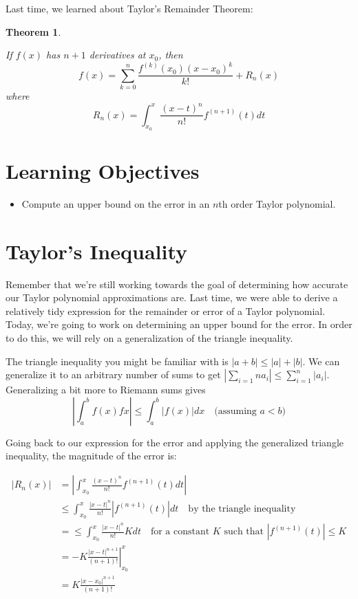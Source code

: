 \documentclass[
]{book}
\providecommand{\tightlist}{%
  \setlength{\itemsep}{0pt}\setlength{\parskip}{0pt}}
\newtheorem{theorem}{Theorem}[chapter]
\theoremstyle{definition}
\theoremstyle{definition}
\theoremstyle{definition}
\theoremstyle{definition}
\theoremstyle{remark}
\begin{document}
Last time, we learned about Taylor's Remainder Theorem:

\begin{theorem}
\protect\hypertarget{thm:unlabeled-div-162}{}\label{thm:unlabeled-div-162}

If \(f(x)\) has \(n+1\) derivatives at \(x_0\), then \[f(x)=\sum_{k=0}^n \frac{f^{(k)}(x_0)(x-x_0)^k}{k!}+R_n(x)\] where \[R_n(x)=\int_{x_0}^x\frac{(x-t)^n}{n!}f^{(n+1)}(t)dt\]

\end{theorem}

\hypertarget{learning-objectives-22}{%
\section{Learning Objectives}\label{learning-objectives-22}}

\begin{itemize}
\tightlist
\item
  Compute an upper bound on the error in an \(n\)th order Taylor polynomial.
\end{itemize}

\hypertarget{taylors-inequality}{%
\section{Taylor's Inequality}\label{taylors-inequality}}

Remember that we're still working towards the goal of determining how accurate our Taylor polynomial approximations are. Last time, we were able to derive a relatively tidy expression for the remainder or error of a Taylor polynomial. Today, we're going to work on determining an upper bound for the error. In order to do this, we will rely on a generalization of the triangle inequality.

The triangle inequality you might be familiar with is \(|a+b|\leq |a|+|b|\). We can generalize it to an arbitrary number of sums to get \(\displaystyle \left | \sum_{i=1}n a_i \right | \leq \sum_{i=1}^n |a_i|\). Generalizing a bit more to Riemann sums gives \[\left |\int_a^b f(x)fx \right |\leq \int_a^b |f(x)|dx \quad \mbox{(assuming $a<b$)}\]

Going back to our expression for the error and applying the generalized triangle inequality, the magnitude of the error is:

\begin{align*}
|R_n(x)|&= \left | \int_{x_0}^x\frac{(x-t)^n}{n!}f^{(n+1)}(t)dt\right |\\
& \leq \int_{x_0}^x\frac{|x-t|^n}{n!}|f^{(n+1)}(t)|dt \quad \mbox{by the triangle inequality}\\
&= \leq \int_{x_0}^x\frac{|x-t|^n}{n!}Kdt  \quad \mbox{for a constant $K$ such that $|f^{(n+1)}(t)|\leq K$} \\
&= -K \left. \frac{|x-t|^{n+1}}{(n+1)!}\right |_{x_0}^x \\
&= K \frac{|x-x_0|^{n+1}}{(n+1)!}
\end{align*}
\end{document}
